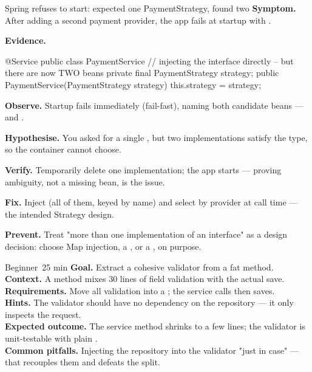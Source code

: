 \begin{debuglab}{Spring refuses to start: expected one PaymentStrategy, found two}
\textbf{Symptom.} After adding a second payment provider, the app fails at startup with .

\smallskip\textbf{Evidence.}
\begin{javabox}
@Service
public class PaymentService {
  // injecting the interface directly -- but there are now TWO beans
  private final PaymentStrategy strategy;
  public PaymentService(PaymentStrategy strategy) {
    this.strategy = strategy;
  }
}
\end{javabox}

\begin{tickcheck}
  \item \textbf{Observe.} Startup fails immediately (fail-fast), naming both candidate beans ---  and .
  \item \textbf{Hypothesise.} You asked for a single , but two implementations satisfy the type, so the container cannot choose.
  \item \textbf{Verify.} Temporarily delete one implementation; the app starts --- proving ambiguity, not a missing bean, is the issue.
  \item \textbf{Fix.} Inject  (all of them, keyed by name) and select by provider at call time --- the intended Strategy design.
  \item \textbf{Prevent.} Treat "more than one implementation of an interface" as a design decision: choose Map injection, a , or a , on purpose.
\end{tickcheck}
\end{debuglab}


\begin{minilab}{Beginner}{~25 min}
\textbf{Goal.} Extract a cohesive validator from a fat method.\\
\textbf{Context.} A  method mixes 30 lines of field validation with the actual save.\\
\textbf{Requirements.} Move all validation into a  ; the service calls  then saves.\\
\textbf{Hints.} The validator should have no dependency on the repository --- it only inspects the request.\\
\textbf{Expected outcome.} The service method shrinks to a few lines; the validator is unit-testable with plain .\\
\textbf{Common pitfalls.} Injecting the repository into the validator "just in case" --- that recouples them and defeats the split.
\end{minilab}


